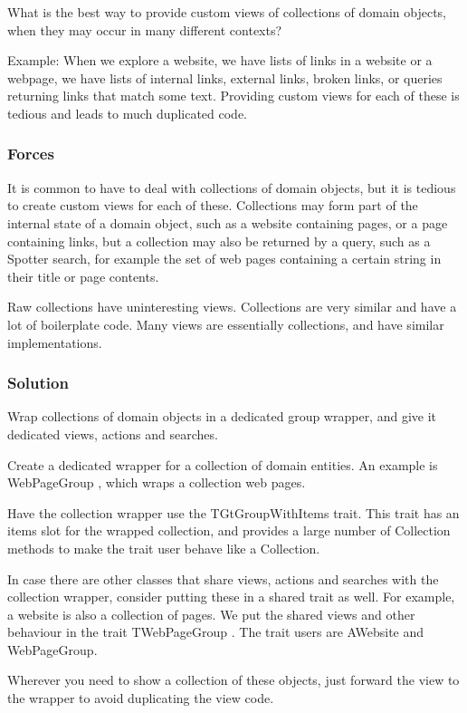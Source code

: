 \documentclass[sigconf]{acmart}
\begin{document}
What is the best way to provide custom views of collections of domain objects, when they may occur in many different contexts?

Example:
When we explore a website, we have lists of links in a website or a webpage, we have lists of internal links, external links, broken links, or queries returning links that match some text. Providing custom views for each of these is tedious and leads to much duplicated code.

\subsubsection*{Forces}

It is common to have to deal with collections of domain objects, but it is tedious to create custom views for each of these. Collections may form part of the internal state of a domain object, such as a website containing pages, or a page containing links, but a collection may also be returned by a query, such as a Spotter search, for example the set of web pages containing a certain string in their title or page contents.

Raw collections have uninteresting views. Collections are very similar and have a lot of boilerplate code. Many views are essentially collections, and have similar implementations.

\subsubsection*{Solution}

Wrap collections of domain objects in a dedicated group wrapper, and give it dedicated views, actions and searches.

Create a dedicated wrapper for a collection of domain entities. An example is WebPageGroup , which wraps a collection web pages.

Have the collection wrapper use the TGtGroupWithItems trait. This trait has an items slot for the wrapped collection, and provides a large number of Collection methods to make the trait user behave like a Collection.

In case there are other classes that share views, actions and searches with the collection wrapper, consider putting these in a shared trait as well. For example, a website is also a collection of pages. We put the shared views and other behaviour in the trait TWebPageGroup . The trait users are AWebsite and WebPageGroup.

Wherever you need to show a collection of these objects, just forward the view to the wrapper to avoid duplicating the view code. 
\end{document}
